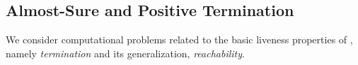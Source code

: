 

\vspace{-1em}
\subsection{Almost-Sure and Positive Termination}
\vspace{-0.5em}
We consider computational problems related to the basic liveness properties of 
, namely \emph{termination} and its generalization, \emph{reachability}. 

